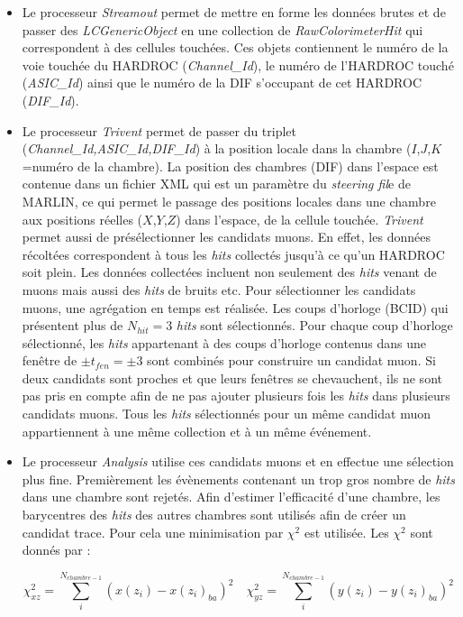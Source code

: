 \begin{itemize}[label=$\bullet$]
	\item Le processeur \textit{Streamout} permet de mettre en forme les données brutes et de passer des \textit{LCGenericObject} en une collection de \textit{RawColorimeterHit} qui correspondent à des cellules touchées. Ces objets contiennent le numéro de la voie touchée du HARDROC (\textit{Channel\_Id}), le numéro de l'HARDROC touché (\textit{ASIC\_Id}) ainsi que le numéro de la DIF s'occupant de cet HARDROC (\textit{DIF\_Id}).
	\item Le processeur \textit{Trivent} permet de passer du triplet (\textit{Channel\_Id,ASIC\_Id,DIF\_Id}) à la position locale dans la chambre ($I$,$J$,$K$=numéro de la chambre). La position des chambres (DIF) dans l'espace est contenue dans un fichier XML qui est un paramètre du \textit{steering fil}e de MARLIN, ce qui permet le passage des positions locales dans une chambre aux positions réelles ($X$,$Y$,$Z$) dans l'espace, de la cellule touchée. \textit{Trivent} permet aussi de présélectionner les candidats muons. En effet, les données récoltées correspondent à tous les \textit{hits} collectés jusqu'à ce qu'un HARDROC soit plein. Les données collectées incluent non seulement des \textit{hits} venant de muons mais aussi des \textit{hits} de bruits etc. Pour sélectionner les candidats muons, une agrégation en temps est réalisée. Les coups d'horloge (BCID) qui présentent plus de $N_{hit}=3$ \textit{hits} sont sélectionnés. Pour chaque coup d'horloge sélectionné, les \textit{hits} appartenant à des coups d'horloge contenus dans une fenêtre de $\pm t_{fen}=\pm3$ sont combinés pour construire un candidat muon. Si deux candidats sont proches et que leurs fenêtres se chevauchent, ils ne sont pas pris en compte afin de ne pas ajouter plusieurs fois les \textit{hits} dans plusieurs candidats muons. Tous les \textit{hits} sélectionnés pour un même candidat muon appartiennent à une même collection et à un même événement.
	\item Le processeur \textit{Analysis} utilise ces candidats muons et en effectue une sélection plus fine. Premièrement les évènements contenant un trop gros nombre de \textit{hits} dans une chambre sont rejetés. Afin d'estimer l'efficacité d'une chambre, les barycentres des \textit{hits} des autres chambres sont utilisés afin de créer un candidat trace. Pour cela une minimisation par $\chi^2$ est utilisée. Les $\chi^2$ sont donnés par :
	
	\begin{equation}
	\chi_{xz}^2=\sum_i^{N_{chambre-1}}\left(x(z_{i})-x(z_{i})_{ba}\right)^2 \quad \chi_{yz}^2=\sum_i^{N_{chambre-1}}\left(y(z_{i})-y(z_{i})_{ba}\right)^2
	\end{equation}
	

\end{itemize}
